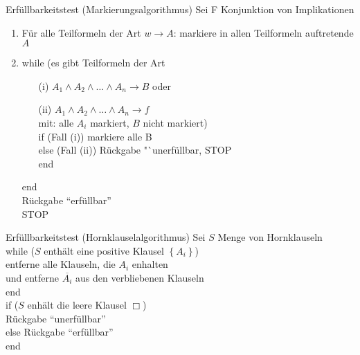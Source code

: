 \begin{frame}{Erfüllbarkeitstest (Markierungsalgorithmus)}
	Sei F Konjunktion von Implikationen
	\begin{enumerate}
		\item Für alle Teilformeln der Art $w \rightarrow A$: markiere in allen Teilformeln auftretende $A$
		\item while (es gibt Teilformeln der Art
		\begin{enumerate}
			\item[(i)] $A_1 \land A_2 \land \ldots \land A_n \rightarrow B$ oder
			\item[(ii)] $A_1 \land A_2 \land \ldots \land A_n \rightarrow f$\\
			mit: alle $A_i$ markiert, $B$ nicht markiert)\\
			if (Fall (i)) markiere alle B\\
			else (Fall (ii)) Rückgabe "`unerfüllbar, STOP\\
			end
		\end{enumerate}
		end\\
		Rückgabe "`erfüllbar"'\\
		STOP
	\end{enumerate}
\end{frame}

\begin{frame}{Erfüllbarkeitstest (Hornklauselalgorithmus)}
	Sei $S$ Menge von Hornklauseln\\
	while ($S$ enthält eine positive Klausel $\left\{A_i\right\}$)\\
	\qquad entferne alle Klauseln, die $A_i$ enhalten\\
	\qquad und entferne $\overline{A_i}$ aus den verbliebenen Klauseln\\
	end\\
	if ($S$ enhält die leere Klausel $\Box$)\\
	\qquad Rückgabe "`unerfüllbar"'\\
	else Rückgabe "`erfüllbar"'\\
	end
\end{frame}

